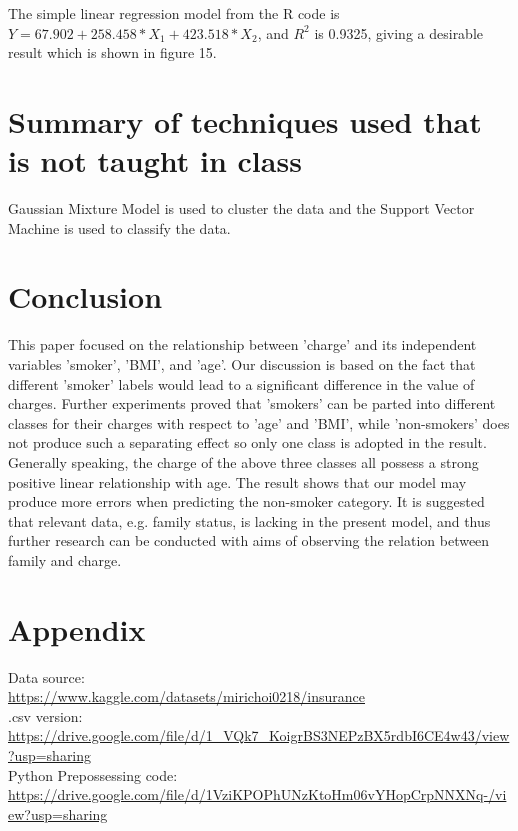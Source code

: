 \documentclass[12pt,a4paper]{article}
\begin{document}
The simple linear regression model from the R code is $Y =  67.902 + 258.458 * X_1 +  423.518 * X_2$, and $R^{2}$ is 0.9325, giving a desirable result which is shown in figure 15.

\section{Summary of techniques used that is not taught in class}

Gaussian Mixture Model is used to cluster the data and the Support Vector Machine is used to classify the data.
\section{Conclusion}
This paper focused on the relationship between 'charge' and its independent variables 'smoker', 'BMI', and 'age'. Our discussion is based on the fact that different 'smoker' labels would lead to a significant difference in the value of charges. Further experiments proved that 'smokers' can be parted into different classes for their charges with respect to 'age' and 'BMI', while 'non-smokers' does not produce such a separating effect so only one class is adopted in the result. Generally speaking, the charge of the above three classes all possess a strong positive linear relationship with age. 
The result shows that our model may produce more errors when predicting the non-smoker category. It is suggested that relevant data, e.g. family status, is lacking in the present model, and thus further research can be conducted with aims of observing the relation between family and charge.


\section{Appendix}
Data source: \\
\url{https://www.kaggle.com/datasets/mirichoi0218/insurance}\\
.csv version: \\
 \url{https://drive.google.com/file/d/1_VQk7_KoigrBS3NEPzBX5rdbI6CE4w43/view?usp=sharing}\\
Python Prepossessing code: \\
 \url{https://drive.google.com/file/d/1VziKPOPhUNzKtoHm06vYHopCrpNNXNq-/view?usp=sharing}
\end{document}
